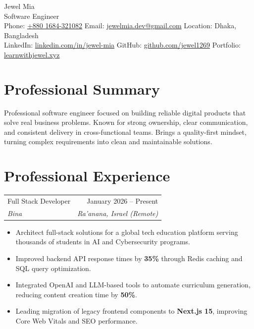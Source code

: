 \documentclass[letterpaper,12pt]{article}
\makeatletter
\newcommand{\semibold}[1]{{\fontseries{sb}\selectfont #1}}
\newcommand{\resumeSubheading}[4]{%
  \vspace{2pt}
  \begin{tabularx}{\linewidth}{@{}X r@{}}
    \semibold{#1} & \semibold{\normalsize #2} \\
    \textit{\normalsize #3} & \textit{\normalsize #4}
  \end{tabularx}
  \vspace{1pt}
}
\newcommand{\resumeItem}[1]{%
  \item #1
}
\newenvironment{resumeItemList}{%
  \begin{itemize}[leftmargin=0.18in, label=\textbullet, itemsep=1pt, topsep=1pt, parsep=0pt]
}{%
  \end{itemize}
}
\makeatother
\begin{document}
\begin{center}
  {\fontsize{24pt}{26pt}\selectfont{}\selectfont Jewel Mia}\\[4pt]
  {\fontsize{13pt}{15pt}\selectfont{}\selectfont Software Engineer}\\[5pt]
  \semibold{Phone:} \href{tel:+8801684321082}{+880 1684-321082}
  \enspace\textbar\enspace
  \semibold{Email:} \href{mailto:jewelmia.dev@gmail.com}{jewelmia.dev@gmail.com}
  \enspace\textbar\enspace
  \semibold{Location:} Dhaka, Bangladesh\\[2pt]
  \semibold{LinkedIn:} \href{https://www.linkedin.com/in/jewel-mia/}{linkedin.com/in/jewel-mia}
  \enspace\textbar\enspace
  \semibold{GitHub:} \href{https://github.com/jewel1269}{github.com/jewel1269}
  \enspace\textbar\enspace
  \semibold{Portfolio:} \href{https://www.learnwithjewel.xyz/}{learnwithjewel.xyz}
\end{center}

\section{Professional Summary}
Professional software engineer focused on building reliable digital products that solve real business problems. Known for strong ownership, clear communication, and consistent delivery in cross-functional teams. Brings a quality-first mindset, turning complex requirements into clean and maintainable solutions.

\section{Professional Experience}

\resumeSubheading
  {Full Stack Developer}{January 2026 -- Present}
  {Bina}{Ra'anana, Israel (Remote)}
\begin{resumeItemList}
  \resumeItem{Architect full-stack solutions for a global tech education platform serving thousands of students in AI and Cybersecurity programs.}
  \resumeItem{Improved backend API response times by \textbf{35\%} through Redis caching and SQL query optimization.}
  \resumeItem{Integrated OpenAI and LLM-based tools to automate curriculum generation, reducing content creation time by \textbf{50\%}.}
  \resumeItem{Leading migration of legacy frontend components to \textbf{Next.js 15}, improving Core Web Vitals and SEO performance.}
\end{resumeItemList}
\end{document}
